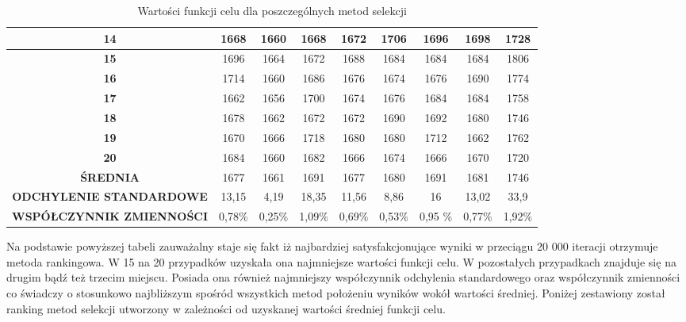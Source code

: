 \begin{itemize}
\begin{table}[h!]
\begin{center}
{\begin{tabular}{|c|c|c|c|c|c|c|c|c|}
\hline
 \textbf{14}&1668&1660&1668&1672&1706&1696&1698&1728\\
\hline
 \textbf{15}&1696&1664&1672&1688&1684&1684&1684&1806\\
\hline
 \textbf{16}&1714&1660&1686&1676&1674&1676&1690&1774\\
\hline
 \textbf{17}&1662&1656&1700&1674&1676&1684&1684&1758 \\
\hline
 \textbf{18}&1678&1662&1672&1672&1690&1692&1680&1746\\
\hline
 \textbf{19}&1670&1666&1718&1680&1680&1712&1662&1762\\
\hline
 \textbf{20}&1684&1660&1682&1666&1674&1666&1670&1720\\
\hline
 \textbf{ŚREDNIA}&1677&1661&1691&1677&1680&1691&1681&1746\\
\hline
 \textbf{ODCHYLENIE STANDARDOWE}&13,15&4,19&18,35&11,56&8,86&16&13,02&33,9\\
\hline
 \textbf{WSPÓŁCZYNNIK ZMIENNOŚCI}&0,78\%&0,25\%&1,09\%&0,69\%&0,53\%&0,95	\%&0,77\%&1,92\%\\
\hline
\end{tabular}}
\caption{Wartości funkcji celu dla poszczególnych metod selekcji}
\label{instancja1}
\end{center}
\end{table}


Na podstawie powyższej tabeli zauważalny staje się fakt iż najbardziej satysfakcjonujące wyniki w przeciągu 20 000 iteracji otrzymuje metoda rankingowa. W 15 na 20 przypadków uzyskała ona najmniejsze wartości funkcji celu. W pozostałych przypadkach znajduje się na drugim bądź też trzecim miejscu. Posiada ona również najmniejszy współczynnik odchylenia standardowego oraz współczynnik zmienności co świadczy o stosunkowo najbliższym spośród wszystkich metod położeniu wyników wokół wartości średniej. Poniżej zestawiony został ranking metod selekcji utworzony w zależności od uzyskanej wartości średniej funkcji celu.\\




\end{itemize}

